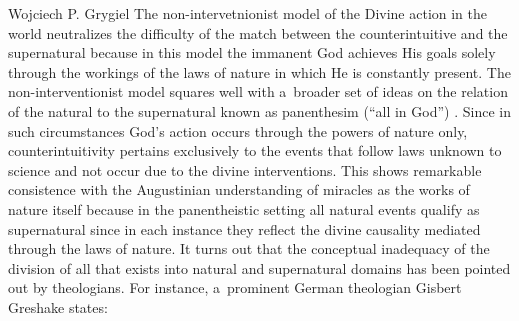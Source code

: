 \begin{artengenv}{Wojciech P. Grygiel}
The non-intervetnionist model of the Divine action in the world neutralizes the difficulty of the match between the counterintuitive and the supernatural because in this model the immanent God achieves His goals solely through the workings of the laws of nature in which He is constantly present. The non-interventionist model squares well with a~broader set of ideas on the relation of the natural to the supernatural known as panenthesim (``all in God'')
\parencite[e.g.][]{peacocke_articulating_2004}. %
 Since in such circumstances God’s action occurs through the powers of nature only, counterintuitivity pertains exclusively to the events that follow laws unknown to science and not occur due to the divine interventions. This shows remarkable consistence with the Augustinian understanding of miracles as the works of nature itself because in the panentheistic setting all natural events qualify as supernatural since in each instance they reflect the divine causality mediated through the laws of nature. It turns out that the conceptual inadequacy of the division of all that exists into natural and supernatural domains has been pointed out by theologians. For instance, a~prominent German theologian Gisbert Greshake 
\parencite*[][p.37]{greshake_dreieine_1997} %
 states:

\end{artengenv}
